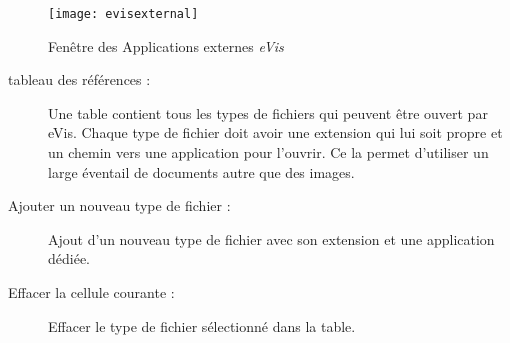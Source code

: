 \begin{figure}[htp]
   \begin{center}
\texttt{[image: evisexternal]}
\caption{Fenêtre des Applications externes \emph{eVis} \nixcaption}\label{evisexternal}
\end{center}
\end{figure}


\begin{description}
\item[tableau des références :] Une table contient tous les types de fichiers qui peuvent être ouvert par eVis. Chaque type de fichier doit avoir une extension qui lui soit propre et un chemin vers une application pour l'ouvrir. Ce la permet d'utiliser un large éventail de documents autre que des images.
\item[Ajouter un nouveau type de fichier :] Ajout d'un nouveau type de fichier avec son extension et une application dédiée.
\item[Effacer la cellule courante :] Effacer le type de fichier sélectionné dans la table.
\end{description}

\label{evis_specifying}

